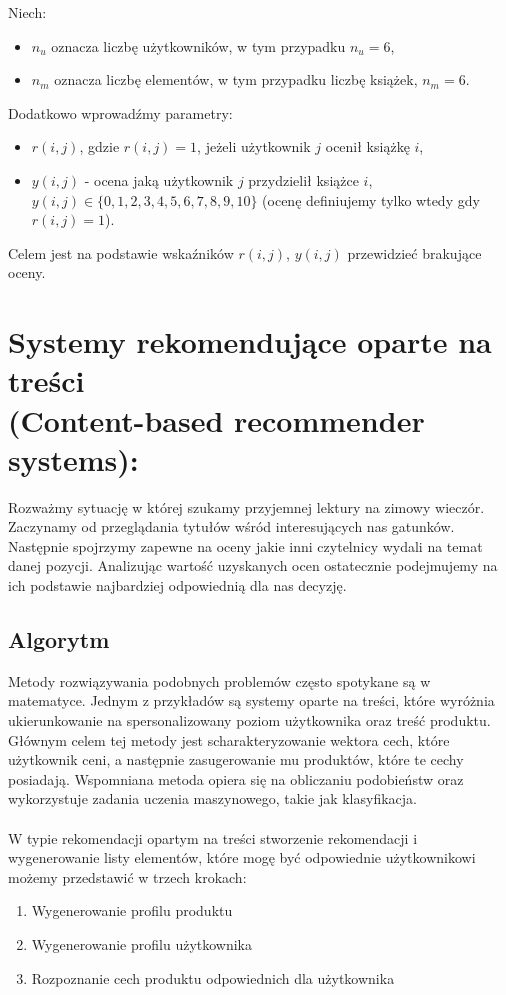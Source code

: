\documentclass[12pt,a4paper]{report}
\begin{document}
Niech:
\begin{itemize}
\item $n_u$ oznacza liczbę użytkowników, w tym przypadku $n_u = 6$,
\item $n_m$ oznacza liczbę elementów, w tym przypadku liczbę książek, $n_m = 6$.
\end{itemize}
Dodatkowo wprowadźmy parametry:
\begin{itemize}
\item $r(i,j)$, gdzie $r(i,j)=1$, jeżeli użytkownik $j$ ocenił książkę $i$,
\item $y(i,j)$ - ocena jaką użytkownik $j$ przydzielił książce $i$, $y(i,j) \in \{0,1,2,3,4,5,6,7,8,9,10\}$ (ocenę definiujemy tylko wtedy gdy $r(i,j)=1$).
\end{itemize}
Celem jest na podstawie wskaźników $r(i,j)$, $y(i,j)$ przewidzieć brakujące oceny.

\section{Systemy rekomendujące oparte na treści 
\\(Content-based recommender systems):}
Rozważmy sytuację w której szukamy przyjemnej lektury na zimowy wieczór. Zaczynamy od przeglądania tytułów wśród interesujących nas gatunków. Następnie spojrzymy zapewne na oceny jakie inni czytelnicy wydali na temat danej pozycji. Analizując wartość uzyskanych ocen ostatecznie podejmujemy na ich podstawie najbardziej odpowiednią dla nas decyzję. 



\subsection{Algorytm}
Metody rozwiązywania podobnych problemów często spotykane są w matematyce. Jednym z przykładów są systemy oparte na treści, które wyróżnia ukierunkowanie na spersonalizowany poziom użytkownika oraz treść produktu. Głównym celem tej metody jest scharakteryzowanie wektora cech, które użytkownik ceni, a następnie zasugerowanie mu produktów, które te cechy posiadają. Wspomniana metoda opiera się na obliczaniu podobieństw oraz wykorzystuje zadania uczenia maszynowego, takie jak klasyfikacja.
\\
\\
W typie rekomendacji opartym na treści stworzenie rekomendacji i wygenerowanie listy elementów, które mogę być odpowiednie użytkownikowi możemy przedstawić w trzech krokach:
\begin{enumerate}
\item{Wygenerowanie profilu produktu}
\item{Wygenerowanie profilu użytkownika}
\item{Rozpoznanie cech produktu odpowiednich dla użytkownika}
\end{enumerate}
\end{document}
